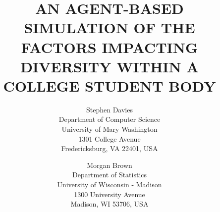 \documentclass{wscpaperproc}
\begin{document}

\title{AN AGENT-BASED SIMULATION OF THE FACTORS IMPACTING \\DIVERSITY WITHIN A
COLLEGE STUDENT BODY}

\author{Stephen Davies\\ [12pt]
Department of Computer Science \\
University of Mary Washington\\
1301 College Avenue \\
Fredericksburg, VA 22401, USA
\and
Morgan Brown\\[12pt]
Department of Statistics \\
University of Wisconsin - Madison\\
1300 University Avenue\\
Madison, WI 53706, USA \\
}

\maketitle









\appendix

\vspace{6pt}





\end{document}
